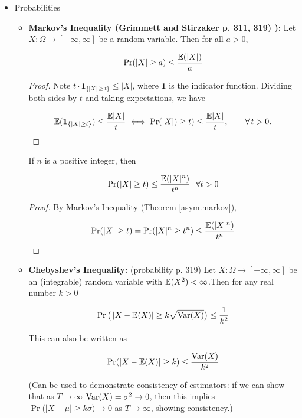 \begin{itemize}

\item Probabilities

\begin{itemize}

\item \begin{lemma}\label{asym.markov} \textbf{Markov's Inequality (Grimmett and Stirzaker p. 311, 319) ):} Let \(X: \Omega \to [-\infty, \infty]\) be a random variable. Then for all \(a > 0\),

\[
\Pr(|X| \geq a) \leq \frac{\mathbb{E}(|X|)}{a}
\]
\end{lemma}
\begin{proof} Note \( t \cdot \boldsymbol{1}_{\{|X| \geq t\}} \leq |X|\), where \(\boldsymbol{1}\) is the indicator function. Dividing both sides by \(t\) and taking expectations, we have \

\[
\mathbb{E}( \boldsymbol{1}_{\{|X| \geq t\}}) \leq \frac{\mathbb{E} |X|}{t} \iff \Pr(|X|)\geq t)\leq\frac{\mathbb{E} |X|}{t},\qquad\forall\,t>0.
\] \end{proof}

\begin{corollary} If \(n\) is a positive integer, then

\[
\Pr(|X| \geq t) \leq \frac{\mathbb{E}(|X|^n)}{t^n} \ \ \forall t > 0
\]

\end{corollary}

\begin{proof}By Markov's Inequality (Theorem \ref{asym.markov}), 

\[
\Pr(|X| \geq t) = \Pr(|X|^n \geq t^n) \leq \frac{\mathbb{E}(|X|^n)}{t^n}
\]

\end{proof}

\item \begin{theorem}\label{asym.cheby}\textbf{Chebyshev's Inequality:} (probability p. 319) Let \(X: \Omega \to [-\infty, \infty]\) be an (integrable) random variable with \(\mathbb{E}(X^2) < \infty\).Then for any real number \(k > 0\)

\[
\Pr \big(\left| X - \mathbb{E}(X) \right| \geq k \sqrt{\mathrm{Var}(X)} \big) \leq \frac{1}{k^2}
\] 

This can also be written as

\[
\Pr(|X - \mathbb{E}(X)| \geq k) \leq \frac{\mathrm{Var}(X)}{k^2}
\]
\end{theorem}

(Can be used to demonstrate consistency of estimators: if we can show that as \(T \to \infty\) \(\mathrm{Var}(X) = \sigma^2 \to 0\), then this implies \(\Pr \big(\left| X - \mu \right| \geq k \sigma \big) \to 0\) as \(T \to \infty\), showing consistency.)


\end{itemize}
\end{itemize}
